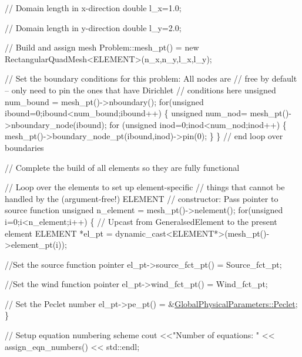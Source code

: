 \begin{DoxyCodeInclude}
 \textcolor{comment}{// Domain length in x-direction}
 \textcolor{keywordtype}{double} l\_x=1.0;

 \textcolor{comment}{// Domain length in y-direction}
 \textcolor{keywordtype}{double} l\_y=2.0;

 \textcolor{comment}{// Build and assign mesh}
 Problem::mesh\_pt() = 
  \textcolor{keyword}{new} RectangularQuadMesh<ELEMENT>(n\_x,n\_y,l\_x,l\_y);

  
 \textcolor{comment}{// Set the boundary conditions for this problem: All nodes are}
 \textcolor{comment}{// free by default -- only need to pin the ones that have Dirichlet }
 \textcolor{comment}{// conditions here}
 \textcolor{keywordtype}{unsigned} num\_bound = mesh\_pt()->nboundary();
 \textcolor{keywordflow}{for}(\textcolor{keywordtype}{unsigned} ibound=0;ibound<num\_bound;ibound++)
  \{
   \textcolor{keywordtype}{unsigned} num\_nod= mesh\_pt()->nboundary\_node(ibound);
   \textcolor{keywordflow}{for} (\textcolor{keywordtype}{unsigned} inod=0;inod<num\_nod;inod++)
    \{
     mesh\_pt()->boundary\_node\_pt(ibound,inod)->pin(0); 
    \}
  \} \textcolor{comment}{// end loop over boundaries}
 
 \textcolor{comment}{// Complete the build of all elements so they are fully functional }

 \textcolor{comment}{// Loop over the elements to set up element-specific }
 \textcolor{comment}{// things that cannot be handled by the (argument-free!) ELEMENT }
 \textcolor{comment}{// constructor: Pass pointer to source function}
 \textcolor{keywordtype}{unsigned} n\_element = mesh\_pt()->nelement();
 \textcolor{keywordflow}{for}(\textcolor{keywordtype}{unsigned} i=0;i<n\_element;i++)
  \{
   \textcolor{comment}{// Upcast from GeneralsedElement to the present element}
   ELEMENT *el\_pt = \textcolor{keyword}{dynamic\_cast<}ELEMENT*\textcolor{keyword}{>}(mesh\_pt()->element\_pt(i));

   \textcolor{comment}{//Set the source function pointer}
   el\_pt->source\_fct\_pt() = Source\_fct\_pt;

   \textcolor{comment}{//Set the wind function pointer}
   el\_pt->wind\_fct\_pt() = Wind\_fct\_pt;

   \textcolor{comment}{// Set the Peclet number}
   el\_pt->pe\_pt() = &\hyperlink{namespaceGlobalPhysicalParameters_ab7011a8f93f2cbd3d45af00151aee3b2}{GlobalPhysicalParameters::Peclet};
  \}

 \textcolor{comment}{// Setup equation numbering scheme}
 cout <<\textcolor{stringliteral}{"Number of equations: "} << assign\_eqn\_numbers() << std::endl; 


\end{DoxyCodeInclude}
